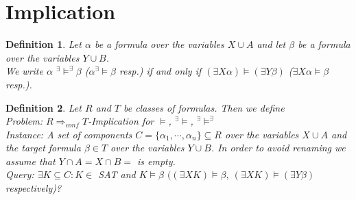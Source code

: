 \documentclass[12pt]{article}
\newcommand{\AM}{\mbox{$^\exists\!\!\models$}}
\newcommand{\AMB}{\mbox{$^\exists\!\!\models^\exists$}}
\newtheorem{definition}{Definition}[section]
\begin{document}
\section{Implication}
\begin{definition}
Let $\alpha$ be a formula over the variables $X \cup A$ and let $\beta$ be a formula over the variables $Y \cup B$.\\
We write $\alpha $ \AMB $\beta$ ($\alpha $\AM $\beta$ resp.) if and only if
$(\exists X \alpha) \models (\exists Y \beta)$ ($\exists X \alpha \models \beta$ resp.).
\end{definition}


%


\begin{definition}
 Let $R$ and $T$ be classes of formulas. Then we define\\
{\em Problem:  $R \Longrightarrow_{conf} T$-Implication for $\models$, \AM, \AMB}\\
{\em Instance}: A set of components $C=\{\alpha_1,\cdots,\alpha_n\} \subseteq R$ over the variables $X \cup A$ and the target formula $\beta \in T$ over the variables $Y \cup B$. In order to avoid renaming we assume that $Y \cap A= X \cap B=$ is empty.\\
{\em Query}:
 $ \exists K \subseteq C: K \in$ SAT and $K \models \beta$ $((\exists X K)  \models \beta, \
(\exists X K) \models (\exists Y \beta)$ respectively)?\\
\end{definition}
\end{document}
